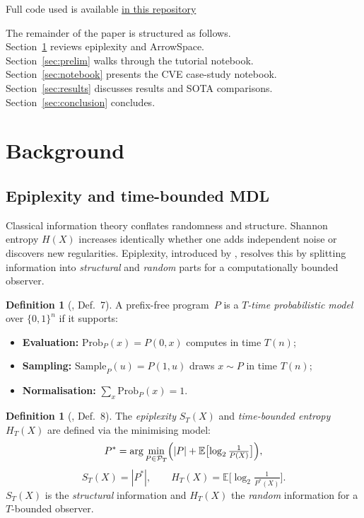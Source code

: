 \documentclass[12pt,a4paper]{article}
\theoremstyle{plain}
\theoremstyle{definition}
\newtheorem{definition}[theorem]{Definition}
\theoremstyle{remark}
\newcommand{\E}{\mathbb{E}}
\newcommand{\1}{\mathbf{1}}
\begin{document}
	Full code used is available \href{https://github.com/tuned-org-uk/graph-wiring-epiplexity}{in this repository}
	
	The remainder of the paper is structured as follows.\\
	Section~\ref{sec:background} reviews epiplexity and ArrowSpace.\\
	Section~\ref{sec:prelim} walks through the tutorial notebook.\\
	Section~\ref{sec:notebook} presents the CVE case-study notebook.\\
	Section~\ref{sec:results} discusses results and SOTA comparisons.\\
	Section~\ref{sec:conclusion} concludes.
	
	\section{Background}
	\label{sec:background}
	
	\subsection{Epiplexity and time-bounded MDL}
	
	Classical information theory conflates randomness and structure.
	Shannon entropy $H(X)$ increases identically whether one adds
	independent noise or discovers new regularities.
	Epiplexity, introduced by \cite{finzi2026epiplexity}, resolves this
	by splitting information into \emph{structural} and \emph{random} parts
	for a computationally bounded observer.
	
	\begin{definition}[\cite{finzi2026epiplexity}, Def.\ 7]
		A prefix-free program~$P$ is a \emph{$T$-time probabilistic model} over
		$\{0,1\}^n$ if it supports:
		\begin{itemize}
			\item \textbf{Evaluation:} $\mathrm{Prob}_P(x) = P(0, x)$ computes
			in time $T(n)$;
			\item \textbf{Sampling:} $\mathrm{Sample}_P(u) = P(1, u)$ draws
			$x\sim P$ in time $T(n)$;
			\item \textbf{Normalisation:} $\sum_{x}\mathrm{Prob}_P(x)=1$.
		\end{itemize}
	\end{definition}
	
	\begin{definition}[\cite{finzi2026epiplexity}, Def.\ 8]
		The \emph{epiplexity} $S_T(X)$ and \emph{time-bounded entropy}
		$H_T(X)$ are defined via the minimising model:
		\[
		P^* = \arg\min_{P\in\mathcal{P}_T}
		\Bigl(|P| + \E\bigl[\log_2\tfrac{1}{P(X)}\bigr]\Bigr),
		\]
		\[
		S_T(X) = |P^*|, \qquad
		H_T(X) = \E\bigl[\log_2\tfrac{1}{P^*(X)}\bigr].
		\]
		$S_T(X)$ is the \emph{structural} information and $H_T(X)$ the
		\emph{random} information for a $T$-bounded observer.
	\end{definition}
	
\end{document}

